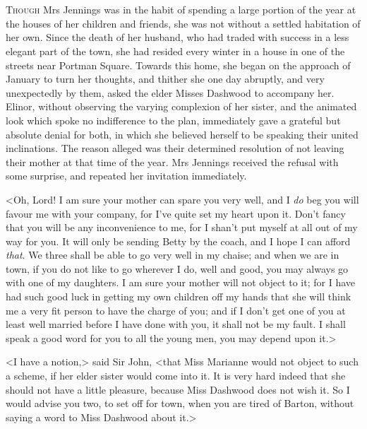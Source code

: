 \chapter[Chapter \thechapter]{}
\lettrine[lraise=0.3]{T}{hough} Mrs Jennings was in the habit of spending a large portion of the year at the houses of her children and friends, she was not without a settled habitation of her own. Since the death of her husband, who had traded with success in a less elegant part of the town, she had resided every winter in a house in one of the streets near Portman Square. Towards this home, she began on the approach of January to turn her thoughts, and thither she one day abruptly, and very unexpectedly by them, asked the elder Misses Dashwood to accompany her. Elinor, without observing the varying complexion of her sister, and the animated look which spoke no indifference to the plan, immediately gave a grateful but absolute denial for both, in which she believed herself to be speaking their united inclinations. The reason alleged was their determined resolution of not leaving their mother at that time of the year. Mrs Jennings received the refusal with some surprise, and repeated her invitation immediately.

<Oh, Lord! I am sure your mother can spare you very well, and I \textit{do} beg you will favour me with your company, for I've quite set my heart upon it. Don't fancy that you will be any inconvenience to me, for I shan't put myself at all out of my way for you. It will only be sending Betty by the coach, and I hope I can afford \textit{that}. We three shall be able to go very well in my chaise; and when we are in town, if you do not like to go wherever I do, well and good, you may always go with one of my daughters. I am sure your mother will not object to it; for I have had such good luck in getting my own children off my hands that she will think me a very fit person to have the charge of you; and if I don't get one of you at least well married before I have done with you, it shall not be my fault. I shall speak a good word for you to all the young men, you may depend upon it.>

<I have a notion,> said Sir John, <that Miss Marianne would not object to such a scheme, if her elder sister would come into it. It is very hard indeed that she should not have a little pleasure, because Miss Dashwood does not wish it. So I would advise you two, to set off for town, when you are tired of Barton, without saying a word to Miss Dashwood about it.>

